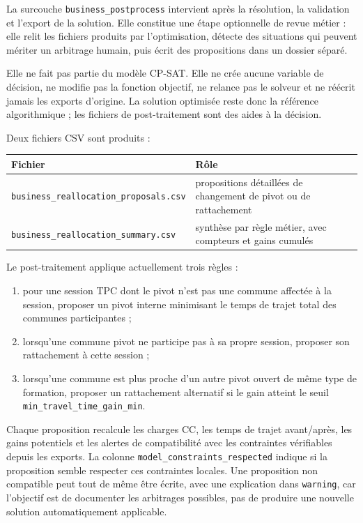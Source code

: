 \documentclass[11pt,a4paper]{article}
\begin{document}
La surcouche \texttt{business\_postprocess} intervient après la résolution, la validation et l'export de la solution. Elle constitue une étape optionnelle de revue métier : elle relit les fichiers produits par l'optimisation, détecte des situations qui peuvent mériter un arbitrage humain, puis écrit des propositions dans un dossier séparé.

Elle ne fait pas partie du modèle CP-SAT. Elle ne crée aucune variable de décision, ne modifie pas la fonction objectif, ne relance pas le solveur et ne réécrit jamais les exports d'origine. La solution optimisée reste donc la référence algorithmique ; les fichiers de post-traitement sont des aides à la décision.

Deux fichiers CSV sont produits :

\begin{longtable}{|L{0.45\textwidth}|L{0.55\textwidth}|}
\hline
Fichier & Rôle \\
\hline
\texttt{business\_reallocation\_proposals.csv} & propositions détaillées de changement de pivot ou de rattachement \\
\hline
\texttt{business\_reallocation\_summary.csv} & synthèse par règle métier, avec compteurs et gains cumulés \\
\hline
\end{longtable}

Le post-traitement applique actuellement trois règles :

\begin{enumerate}
\item pour une session TPC dont le pivot n'est pas une commune affectée à la session, proposer un pivot interne minimisant le temps de trajet total des communes participantes ;
\item lorsqu'une commune pivot ne participe pas à sa propre session, proposer son rattachement à cette session ;
\item lorsqu'une commune est plus proche d'un autre pivot ouvert de même type de formation, proposer un rattachement alternatif si le gain atteint le seuil \texttt{min\_travel\_time\_gain\_min}.
\end{enumerate}

Chaque proposition recalcule les charges CC, les temps de trajet avant/après, les gains potentiels et les alertes de compatibilité avec les contraintes vérifiables depuis les exports. La colonne \texttt{model\_constraints\_respected} indique si la proposition semble respecter ces contraintes locales. Une proposition non compatible peut tout de même être écrite, avec une explication dans \texttt{warning}, car l'objectif est de documenter les arbitrages possibles, pas de produire une nouvelle solution automatiquement applicable.
\end{document}
